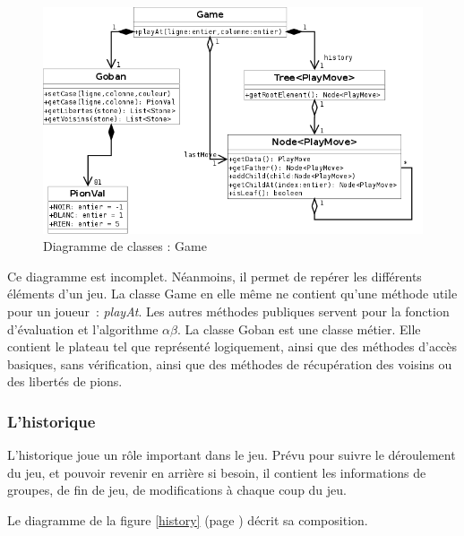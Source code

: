 \documentclass[11pt,a4paper,titlepage,french]{article}
\begin{document}
				\begin{figure}[hbt]
					\begin{center}
						\includegraphics[width=1.1\textwidth]{./classes.png}
					\end{center}
					\caption{Diagramme de classes : Game}
					\label{classes}
				\end{figure}

			Ce diagramme est incomplet. Néanmoins, il permet de repérer les différents éléments d'un jeu. La classe Game en elle même ne contient qu'une méthode utile pour un joueur~: \emph{playAt}. Les autres méthodes publiques servent pour la fonction d'évaluation et l'algorithme $\alpha\beta$. La classe Goban est une classe métier. Elle contient le plateau tel que représenté logiquement, ainsi que des méthodes d'accès basiques, sans vérification, ainsi que des méthodes de récupération des voisins ou des libertés de pions.


			\subsubsection{L'historique}

				L'historique joue un rôle important dans le jeu. Prévu pour suivre le déroulement du jeu, et pouvoir revenir en arrière si besoin, il contient les informations de groupes, de fin de jeu, de modifications à chaque coup du jeu.

				Le diagramme de la figure \ref{history} (page \pageref{history}) décrit sa composition.
\end{document}
